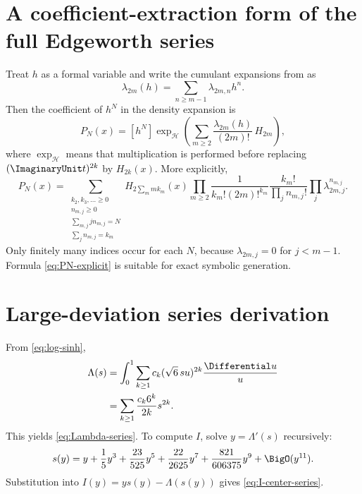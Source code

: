 \documentclass[11pt]{article}
\numberwithin{equation}{section}
\theoremstyle{definition}
\begin{document}
\section{A coefficient-extraction form of the full Edgeworth series}\label{app:coefficient}
Treat \(h\) as a formal variable and write the cumulant expansions from  as
\[
 \lambda_{2m}(h)=\sum_{n\ge m-1}\lambda_{2m,n}h^n.
\]
Then the coefficient of \(h^N\) in the density expansion is
\begin{equation}\label{eq:coefficient-extraction}
 P_N(x)=[h^N]\exp_{\mathcal H}\!\left(
 \sum_{m\ge2}\frac{\lambda_{2m}(h)}{(2m)!}\,H_{2m}\right),
\end{equation}
where \(\exp_{\mathcal H}\) means that multiplication is performed before replacing \((\ImaginaryUnit t)^{2k}\) by \(H_{2k}(x)\).  More explicitly,
\begin{equation}\label{eq:PN-explicit}
 P_N(x)=
 \sum_{\substack{k_2,k_3,\ldots\ge0\\
 n_{m,j}\ge0\\
 \sum_{m,j}jn_{m,j}=N\\
 \sum_jn_{m,j}=k_m}}
 H_{2\sum_mmk_m}(x)
 \prod_{m\ge2}\frac1{k_m!(2m)!^{k_m}}
 \frac{k_m!}{\prod_jn_{m,j}!}
 \prod_j\lambda_{2m,j}^{n_{m,j}}.
\end{equation}
Only finitely many indices occur for each \(N\), because \(\lambda_{2m,j}=0\) for \(j<m-1\).  Formula \eqref{eq:PN-explicit} is suitable for exact symbolic generation.

\section{Large-deviation series derivation}\label{app:ldp-series}
From \eqref{eq:log-sinh},
\begin{align*}
\Lambda(s)
&=\int_0^1\sum_{k\ge1}c_k(\sqrt6\,su)^{2k}\frac{\Differential u}{u}\\
&=\sum_{k\ge1}\frac{c_k6^k}{2k}s^{2k}.
\end{align*}
This yields \eqref{eq:Lambda-series}.  To compute \(I\), solve \(y=\Lambda'(s)\) recursively:
\begin{equation}\label{eq:s-of-y}
 s(y)=y+\frac15y^3+\frac{23}{525}y^5+\frac{22}{2625}y^7
 +\frac{821}{606375}y^9+\BigO(y^{11}).
\end{equation}
Substitution into \(I(y)=ys(y)-\Lambda(s(y))\) gives \eqref{eq:I-center-series}.
\end{document}
